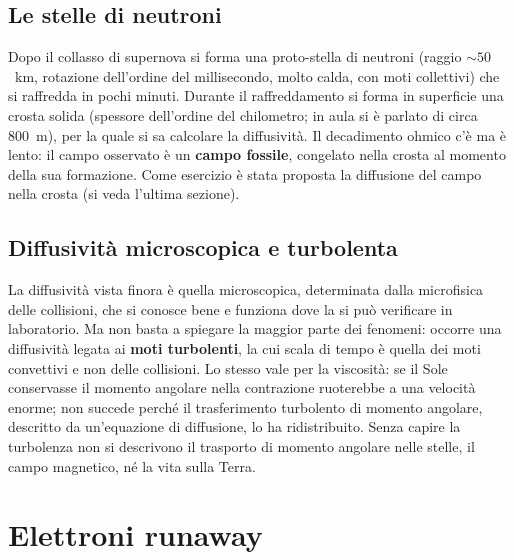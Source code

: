 \subsection{Le stelle di neutroni}
Dopo il collasso di supernova si forma una proto-stella di neutroni (raggio $\sim50$~km, rotazione dell'ordine del millisecondo, molto calda, con moti collettivi) che si raffredda in pochi minuti. Durante il raffreddamento si forma in superficie una crosta solida (spessore dell'ordine del chilometro; in aula si è parlato di circa 800~m), per la quale si sa calcolare la diffusività.
Il decadimento ohmico c'è ma è lento: il campo osservato è un \textbf{campo fossile}, congelato nella crosta al momento della sua formazione. Come esercizio è stata proposta la diffusione del campo nella crosta (si veda l'ultima sezione).

\subsection{Diffusività microscopica e turbolenta}
La diffusività vista finora è quella microscopica, determinata dalla microfisica delle collisioni, che si conosce bene e funziona dove la si può verificare in laboratorio. Ma non basta a spiegare la maggior parte dei fenomeni: occorre una diffusività legata ai \textbf{moti turbolenti}, la cui scala di tempo è quella dei moti convettivi e non delle collisioni.
Lo stesso vale per la viscosità: se il Sole conservasse il momento angolare nella contrazione ruoterebbe a una velocità enorme; non succede perché il trasferimento turbolento di momento angolare, descritto da un'equazione di diffusione, lo ha ridistribuito. Senza capire la turbolenza non si descrivono il trasporto di momento angolare nelle stelle, il campo magnetico, né la vita sulla Terra.

\section{Elettroni runaway}

